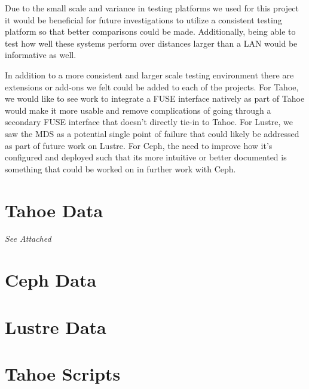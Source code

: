 \documentclass[11pt]{article}
\begin{document}
Due to the small scale and variance in testing platforms we used for this project it would be beneficial for future investigations to utilize a consistent testing platform so that better comparisons could be made. Additionally, being able to test how well these systems perform over distances larger than a LAN would be informative as well. 

In addition to a more consistent and larger scale testing environment there are extensions or add-ons we felt could be added to each of the projects. For Tahoe, we would like to see work to integrate a FUSE interface natively as part of Tahoe would make it more usable and remove complications of going through a secondary FUSE interface that doesn't directly tie-in to Tahoe. For Lustre, we saw the MDS as a potential single point of failure that could likely be addressed as part of future work on Lustre. For Ceph, the need to improve how it's configured and deployed such that its more intuitive or better documented is something that could be worked on in further work with Ceph. 

\nocite{*}


\appendix

\pagebreak
\section{Tahoe Data}
\label{sec:TahoeData}

\emph{See Attached}




\pagebreak
\section{Ceph Data}
\label{sec:CephData}

\pagebreak
\section{Lustre Data}
\label{sec:LustreData}

\pagebreak
\section{Tahoe Scripts}
\label{sec:TahoeScripts}


\end{document}
